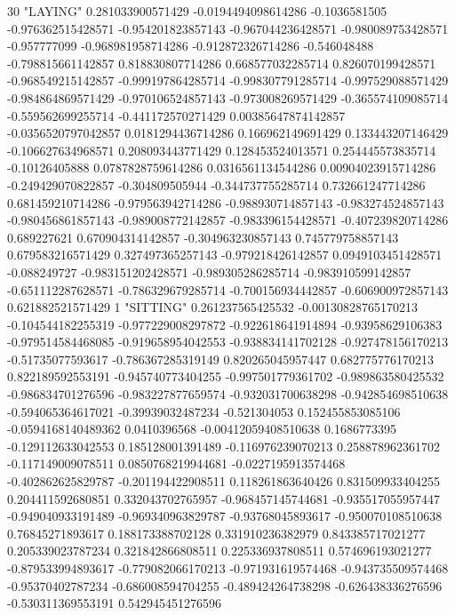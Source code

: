 30 "LAYING" 0.281033900571429 -0.0194494098614286 -0.1036581505 -0.976362515428571 -0.954201823857143 -0.967044236428571 -0.980089753428571 -0.957777099 -0.968981958714286 -0.912872326714286 -0.546048488 -0.798815661142857 0.818830807714286 0.668577032285714 0.826070199428571 -0.968549215142857 -0.999197864285714 -0.998307791285714 -0.997529088571429 -0.984864869571429 -0.970106524857143 -0.973008269571429 -0.365574109085714 -0.559562699255714 -0.441172570271429 0.00385647874142857 -0.0356520797042857 0.0181294436714286 0.166962149691429 0.133443207146429 -0.106627634968571 0.208093443771429 0.128453524013571 0.254445573835714 -0.10126405888 0.0787828759614286 0.0316561134544286 0.00904023915714286 -0.249429070822857 -0.304809505944 -0.344737755285714 0.732661247714286 0.681459210714286 -0.979563942714286 -0.988930714857143 -0.983274524857143 -0.980456861857143 -0.989008772142857 -0.983396154428571 -0.407239820714286 0.689227621 0.670904314142857 -0.304963230857143 0.745779758857143 0.679583216571429 0.327497365257143 -0.979218426142857 0.0949103451428571 -0.088249727 -0.983151202428571 -0.989305286285714 -0.983910599142857 -0.651112287628571 -0.786329679285714 -0.700156934442857 -0.606900972857143 0.621882521571429
1 "SITTING" 0.261237565425532 -0.00130828765170213 -0.104544182255319 -0.977229008297872 -0.922618641914894 -0.93958629106383 -0.979514584468085 -0.919658954042553 -0.938834141702128 -0.927478156170213 -0.51735077593617 -0.786367285319149 0.820265045957447 0.682775776170213 0.822189592553191 -0.945740773404255 -0.997501779361702 -0.989863580425532 -0.986834701276596 -0.983227877659574 -0.932031700638298 -0.942854698510638 -0.594065364617021 -0.39939032487234 -0.521304053 0.152455853085106 -0.0594168140489362 0.0410396568 -0.00412059408510638 0.1686773395 -0.129112633042553 0.185128001391489 -0.116976239070213 0.258878962361702 -0.117149009078511 0.0850768219944681 -0.0227195913574468 -0.402862625829787 -0.201194422908511 0.118261863640426 0.831509933404255 0.204411592680851 0.332043702765957 -0.968457145744681 -0.935517055957447 -0.949040933191489 -0.969340963829787 -0.93768045893617 -0.950070108510638 0.76845271893617 0.188173388702128 0.331910236382979 0.843385717021277 0.205339023787234 0.321842866808511 0.225336937808511 0.574696193021277 -0.879533994893617 -0.779082066170213 -0.971931619574468 -0.943735509574468 -0.95370402787234 -0.686008594704255 -0.489424264738298 -0.626438336276596 -0.530311369553191 0.542945451276596
